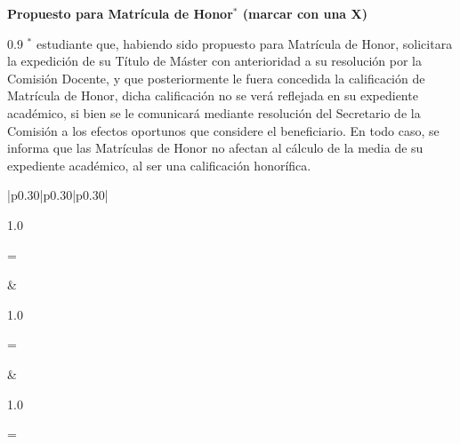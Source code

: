 \documentclass[11pt,a4paper,oneside]{article}
\newlength{\TFMTribunalSignatureLabelWidth}
\newcommand{\TFMTribunalSignature}[1]{%
  \par
  \begingroup
  \raggedright
  \settowidth{\TFMTribunalSignatureLabelWidth}{Fdo.: }%
  \hangindent=\TFMTribunalSignatureLabelWidth
  \hangafter=1
  \makebox[\TFMTribunalSignatureLabelWidth][l]{Fdo.: }#1\par
  \endgroup}
\begin{document}
\vspace{0.25cm}

\noindent\textbf{Propuesto para Matrícula de Honor$^{*}$ (marcar con una X)}
\hfill \MHProposalBoxes{}

\vspace{0.45cm}

\begin{spacing}{0.9}
\noindent$^{*}$ \CapitalizeFirstLetter{\wordAutorElOrLa} estudiante que, habiendo sido propuesto para Matrícula de Honor, solicitara la expedición de su Título de Máster con anterioridad a su resolución por la Comisión Docente, y que posteriormente le fuera concedida la calificación de Matrícula de Honor, dicha calificación no se verá reflejada en su expediente académico, si bien se le comunicará mediante resolución del Secretario de la Comisión a los efectos oportunos que considere el beneficiario. En todo caso, se informa que las Matrículas de Honor no afectan al cálculo de la media de su expediente académico, al ser una calificación honorífica.
\end{spacing}

\vfill

\begin{table}[ht]
  \centering
  \begin{tabular}{|p{0.30\textwidth}|p{0.30\textwidth}|p{0.30\textwidth}|}
    \hline
    \begin{minipage}[t][3.5cm][t]{\linewidth}
      \vspace*{-0.2cm}
      \textbf{\wordPresidenteOrPresidenta}

      \vfill
      {\small \begin{spacing}{1.0}\TFMTribunalSignature{\myTribunalPresident}\end{spacing}}
      \vspace{0.2cm}
    \end{minipage}
    &
    \begin{minipage}[t][3.5cm][t]{\linewidth}
      \vspace*{-0.2cm}
      \textbf{\wordVocalPrimeroOrPrimera{} \wordNumberVocalPrimeroOrPrimera}

      \vfill
      {\small \begin{spacing}{1.0}\TFMTribunalSignature{\myTribunalFirstSpokesperson}\end{spacing}}
      \vspace{0.2cm}
    \end{minipage}
    &
    \begin{minipage}[t][3.5cm][t]{\linewidth}
      \vspace*{-0.2cm}
      \textbf{\wordVocalSegundoOrSegunda{} \wordNumberVocalSegundoOrSegunda}

      \vfill
      {\small \begin{spacing}{1.0}\TFMTribunalSignature{\myTribunalSecondSpokesperson}\end{spacing}}
      \vspace{0.2cm}
    \end{minipage}
    \\
    \hline
  \end{tabular}
\end{table}
\end{document}
